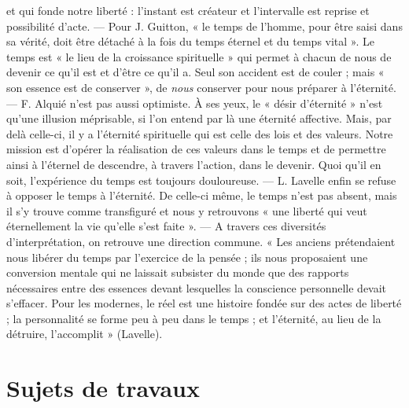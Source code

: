 et qui fonde notre liberté : l'instant est créateur et l'intervalle est
reprise et possibilité d’acte. — Pour J. Guitton, « le temps de
l’homme, pour être saisi dans sa vérité, doit être détaché à la fois du
temps éternel et du temps vital ». Le temps est « le lieu de la croissance
spirituelle » qui permet à chacun de nous de devenir ce qu’il est et
d’être ce qu’il a. Seul son accident est de couler ; mais « son essence
est de conserver », de {\it nous} conserver pour nous préparer à l'éternité.
— F. Alquié n’est pas aussi optimiste. À ses yeux, le « désir d’éternité »
n’est qu’une illusion méprisable, si l’on entend par là une éternité
affective. Mais, par delà celle-ci, il y a l’éternité spirituelle qui
est celle des lois et des valeurs. Notre mission est d’opérer la réalisation
de ces valeurs dans le temps et de permettre ainsi à l’éternel
de descendre, à travers l’action, dans le devenir. Quoi qu’il en soit,
l'expérience du temps est toujours douloureuse. — L. Lavelle
enfin se refuse à opposer le temps à l’éternité. De celle-ci même, le
temps n’est pas absent, mais il s’y trouve comme transfiguré et nous
y retrouvons « une liberté qui veut éternellement la vie qu’elle
s’est faite ». — A travers ces diversités d'interprétation, on retrouve
une direction commune. « Les anciens prétendaient nous libérer du
temps par l’exercice de la pensée ; ils nous proposaient une conversion
mentale qui ne laissait subsister du monde que des rapports nécessaires
entre des essences devant lesquelles la conscience personnelle devait
s’effacer. Pour les modernes, le réel est une histoire fondée sur des
actes de liberté ; la personnalité se forme peu à peu dans le temps ; et
l'éternité, au lieu de la détruire, l’accomplit » (Lavelle).

\section{Sujets de travaux}%

